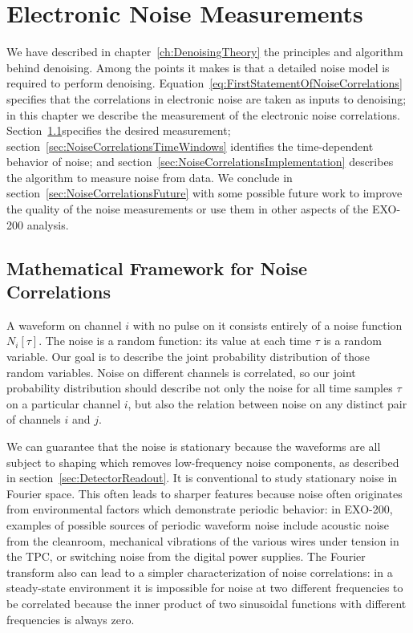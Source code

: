 \renewcommand{\thechapter}{5}
\chapter{Electronic Noise Measurements}
\label{ch:NoiseMeasurements}

We have described in chapter~\ref{ch:DenoisingTheory} the principles and algorithm behind denoising.  Among the points it makes is that a detailed noise model is required to perform denoising.  Equation~\ref{eq:FirstStatementOfNoiseCorrelations} specifies that the correlations in electronic noise are taken as inputs to denoising; in this chapter we describe the measurement of the electronic noise correlations.  Section~\ref{sec:NoiseCorrelationsMath}specifies the desired measurement; section~\ref{sec:NoiseCorrelationsTimeWindows} identifies the time-dependent behavior of noise; and section~\ref{sec:NoiseCorrelationsImplementation} describes the algorithm to measure noise from data.  We conclude in section~\ref{sec:NoiseCorrelationsFuture} with some possible future work to improve the quality of the noise measurements or use them in other aspects of the EXO-200 analysis.

\section{Mathematical Framework for Noise Correlations}\label{sec:NoiseCorrelationsMath}

A waveform on channel $i$ with no pulse on it consists entirely of a noise function $N_i[\tau]$.  The noise is a random function:  its value at each time $\tau$ is a random variable.  Our goal is to describe the joint probability distribution of those random variables.  Noise on different channels is correlated, so our joint probability distribution should describe not only the noise for all time samples $\tau$ on a particular channel $i$, but also the relation between noise on any distinct pair of channels $i$ and $j$.

We can guarantee that the noise is stationary because the waveforms are all subject to shaping which removes low-frequency noise components, as described in section~\ref{sec:DetectorReadout}.  It is conventional to study stationary noise in Fourier space.  This often leads to sharper features because noise often originates from environmental factors which demonstrate periodic behavior: in EXO-200, examples of possible sources of periodic waveform noise include acoustic noise from the cleanroom, mechanical vibrations of the various wires under tension in the TPC, or switching noise from the digital power supplies.  The Fourier transform also can lead to a simpler characterization of noise correlations: in a steady-state environment it is impossible for noise at two different frequencies to be correlated because the inner product of two sinusoidal functions with different frequencies is always zero.

